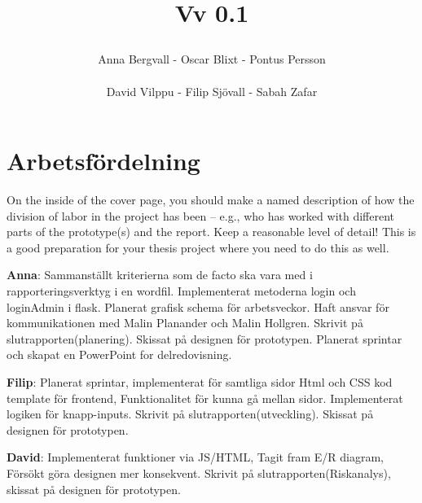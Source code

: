 \documentclass[12pt]{article}
\date {#1}
\title {
    \documentNumber {01}    

    \documentTitle {Helsingborg Event and Convention Bureau}
    
    \documentDate {\today}
    \documentVersion Vv 0.1
    
\author{Anna Bergvall - Oscar Blixt - Pontus Persson\\\\ David Vilppu - Filip Sjövall - Sabah Zafar}



}
\begin{document}
\maketitle
\thispagestyle{empty}



\newpage

\tableofcontents



\newpage

   
   


\newpage

\section{Arbetsfördelning}
On the inside of the cover page, you should make a named description of how the division of labor in the project has been – e.g., who has worked with different parts of the prototype(s) and the report. Keep a reasonable level of detail! This is a good preparation for your thesis project where you need to do this as well.
    

\textbf{Anna}: Sammanställt kriterierna som de facto ska vara med i rapporteringsverktyg i en wordfil. Implementerat metoderna login och loginAdmin i flask. Planerat grafisk schema för arbetsveckor. Haft ansvar för kommunikationen med Malin Planander och Malin Hollgren. Skrivit på slutrapporten(planering). Skissat på designen för prototypen. Planerat sprintar och skapat en PowerPoint for delredovisning.

\textbf{Filip}: Planerat sprintar, implementerat för samtliga sidor Html och CSS kod template för frontend, Funktionalitet för kunna gå mellan sidor. Implementerat logiken för knapp-inputs. Skrivit på slutrapporten(utveckling). Skissat på designen för prototypen. 

\textbf{David}: Implementerat funktioner via JS/HTML, Tagit fram E/R diagram, Försökt göra designen mer konsekvent. Skrivit på slutrapporten(Riskanalys), skissat på designen för prototypen. 
\end{document}
